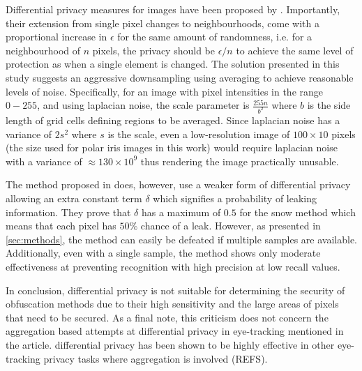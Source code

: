 Differential privacy measures for images have been proposed by \parencite{fan2018image}. Importantly, their extension from single pixel changes to neighbourhoods, come with a proportional increase in $\epsilon$ for the same amount of randomness, i.e. for a neighbourhood of $n$ pixels, the privacy should be $\epsilon/n$ to achieve the same level of protection as when a single element is changed. The solution presented in this study suggests an aggressive downsampling using averaging to achieve reasonable levels of noise. Specifically, for an image with pixel intensities in the range $0-255$, and using laplacian noise, the scale parameter is $\frac{255n}{b^2}$ where $b$ is the side length of grid cells defining regions to be averaged. Since laplacian noise has a variance of $2s^2$ where $s$ is the scale, even a low-resolution image of $100\times 10$ pixels (the size used for polar iris images in this work) would require laplacian noise with a variance of $\approx 130\times 10^9$ thus rendering the image practically unusable.

The method proposed in \parencite{BRENDAN_SNOW} does, however, use a weaker form of differential privacy allowing an extra constant term $\delta$ which signifies a probability of leaking information. They prove that $\delta$ has a maximum of $0.5$ for the snow method which means that each pixel has $50\%$ chance of a leak. However, as presented in \cref{sec:methods}, the method can easily be defeated if multiple samples are available. Additionally, even with a single sample, the method shows only moderate effectiveness at preventing recognition with high precision at low recall values. 

In conclusion, differential privacy is not suitable for determining the security of obfuscation methods due to their high sensitivity and the large areas of pixels that need to be secured. As a final note, this criticism does not concern the aggregation based attempts at differential privacy in eye-tracking mentioned in the article. %
 differential privacy has been shown to be highly effective in other eye-tracking privacy tasks where aggregation is involved (REFS).



